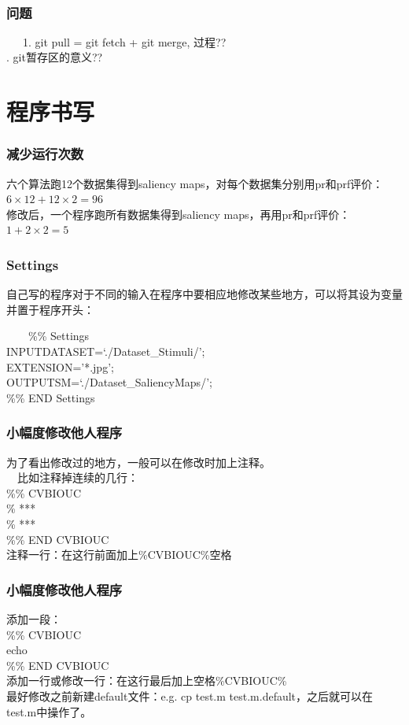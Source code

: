 \documentclass[notheorems,mathserif,table,compress]{beamer}  %
\begin{document}
\begin{frame}
　　\frametitle{问题}
　 \,1. git pull = git fetch + git merge, 过程??\\
  \qquad {}. git暂存区的意义??
\end{frame}


\section{程序书写}

\begin{frame}
  \frametitle{减少运行次数}
  六个算法跑12个数据集得到saliency maps，对每个数据集分别用pr和prf评价：
  $6 \times 12 + 12 \times 2 = 96$\\
  修改后，一个程序跑所有数据集得到saliency maps，再用pr和prf评价：
  $1 + 2 \times 2 = 5$  
\end{frame}


\begin{frame}
  \frametitle{Settings}
  自己写的程序对于不同的输入在程序中要相应地修改某些地方，可以将其设为变量并置于程序开头：

　　\%\% Settings\\
  \quad \quad INPUTDATASET=`./Dataset\_Stimuli/';\\
  \quad \quad EXTENSION='*.jpg';\\
  \quad \quad OUTPUTSM=`./Dataset\_SaliencyMaps/'; \\
  \quad \quad \%\% END Settings\\
\end{frame}


\begin{frame}
  \frametitle{小幅度修改他人程序}
  为了看出修改过的地方，一般可以在修改时加上注释。\\
　比如注释掉连续的几行：\\
  \%\% CVBIOUC\\
  \% ***\\
  \% ***\\
  \%\% END CVBIOUC\\
  注释一行：在这行前面加上\%CVBIOUC\%空格
\end{frame}


\begin{frame}
  \frametitle{小幅度修改他人程序}
  添加一段：\\
  \%\% CVBIOUC\\
  echo\\
  \%\% END CVBIOUC\\
  添加一行或修改一行：在这行最后加上空格\%CVBIOUC\% \\
  最好修改之前新建default文件：e.g. cp test.m test.m.default，之后就可以在test.m中操作了。
\end{frame}
\end{document}
